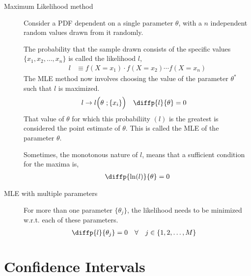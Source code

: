 \begin{description}
    \item[Maximum Likelihood method] Consider a PDF dependent on a single parameter
          $ \theta $, with a $ n $ independent random values drawn from it randomly.
          \par The probability that the sample drawn consists of the specific values
          $ \{x_1,x_2,\dots,x_n\} $ is called the likelihood $ l $,
          \begin{align}
              l & \equiv f(X = x_1) \cdot f(X = x_2) \cdots f(X = x_n)
          \end{align}
          The MLE method now involves choosing the value of the parameter $ \theta^* $
          such that $ l $ is maximized.
          \begin{align}
              l                  & \to l\Big( \theta\ ; \{x_i\}\Big) &
              \diffp {l}{\theta} & = 0
          \end{align}
          That value of $ \theta $ for which this probabiliity $ (l) $ is the greatest
          is considered the point estimate of $ \theta $. This is called the MLE of
          the parameter $ \theta $. \par
          Sometimes, the monotonous nature of $ l $, means that a sufficient condition
          for the maxima is,
          \begin{align}
              \diffp {\ln(l)}{\theta} = 0
          \end{align}

    \item[MLE with multiple parameters] For more than one parameter $ \{\theta_j\} $,
          the likelihood needs to be minimized w.r.t. each of these parameters.
          \begin{align}
              \diffp {l}{\theta_j} & = 0 & \forall \quad j & \in \{1,2,\dots,M\}
          \end{align}
\end{description}

\section{Confidence Intervals}

